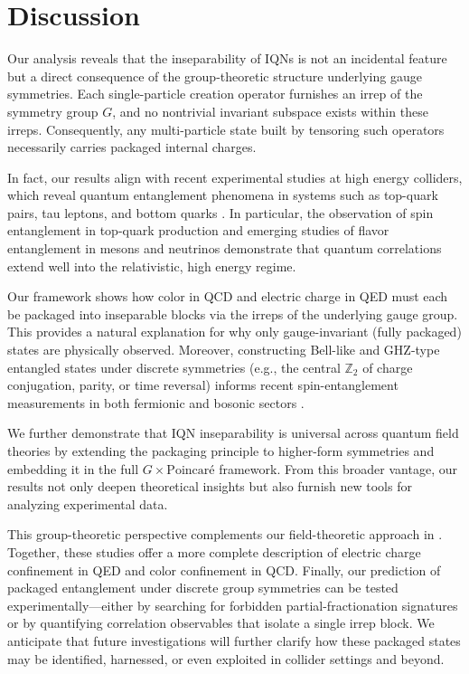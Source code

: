 \documentclass[12pt,a4paper]{article}
\begin{document}
\section{Discussion}

Our analysis reveals that the inseparability of IQNs is not an incidental feature but a direct consequence of the group-theoretic structure underlying gauge symmetries.
Each single-particle creation operator furnishes an irrep of the symmetry group $G$, and no nontrivial invariant subspace exists within these irreps.
Consequently, any multi-particle state built by tensoring such operators necessarily carries packaged internal charges.


In fact, our results align with recent experimental studies at high energy colliders, which reveal quantum entanglement phenomena in systems such as top-quark pairs, tau leptons, and bottom quarks \cite{TheATLASCollaboration2024,TheCMSCollaboration2024,FabbrichesiFloreaniniGabrielli2023,Afik2024}.
In particular, the observation of spin entanglement in top-quark production \cite{TheATLASCollaboration2024,TheCMSCollaboration2024,HayrapetyanCMSCollaboration2024} and emerging studies of flavor entanglement in mesons and neutrinos \cite{Blasone2009,Go2007} demonstrate that quantum correlations extend well into the relativistic, high energy regime.


Our framework shows how color in QCD and electric charge in QED must each be packaged into inseparable blocks via the irreps of the underlying gauge group.
This provides a natural explanation for why only gauge-invariant (fully packaged) states are physically observed.
Moreover, constructing Bell-like and GHZ-type entangled states under discrete symmetries (e.g., the central $\mathbb Z_2$ of charge conjugation, parity, or time reversal) informs recent spin-entanglement measurements in both fermionic and bosonic sectors \cite{AfikNova2021,AfikNova2022,Barr2022,AguilarSaavedra2023}.


We further demonstrate that IQN inseparability is universal across quantum field theories by extending the packaging principle to higher-form symmetries and embedding it in the full $G\times\mathrm{Poincaré}$ framework.
From this broader vantage, our results not only deepen theoretical insights but also furnish new tools for analyzing experimental data.


This group-theoretic perspective complements our field-theoretic approach in \cite{MaSPI2025}.
Together, these studies offer a more complete description of electric charge confinement in QED and color confinement in QCD.
Finally, our prediction of packaged entanglement under discrete group symmetries can be tested experimentally—either by searching for forbidden partial-fractionation signatures or by quantifying correlation observables that isolate a single irrep block.
We anticipate that future investigations will further clarify how these packaged states may be identified, harnessed, or even exploited in collider settings and beyond.
\end{document}
